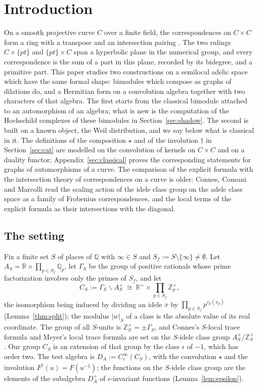 \documentclass[11pt]{amsart}
\theoremstyle{definition}
\theoremstyle{remark}
\newcommand{\R}{\mathbb R}
\newcommand{\Z}{\mathbb Z}
\newcommand{\Q}{\mathbb Q}
\begin{document}
\setcounter{tocdepth}{1}
\tableofcontents

\section{Introduction}\label{sec:intro}

On a smooth projective curve $C$ over a finite field, the correspondences on
$C\times C$ form a ring with a transpose and an intersection pairing
\cite{Weil1948}.  The two rulings $C\times\{pt\}$ and $\{pt\}\times C$ span a
hyperbolic plane in the numerical group, and every correspondence is the sum
of a part in this plane, recorded by its bidegree, and a primitive part.
This paper studies two constructions on a semilocal adelic space which have
the same formal shape: bimodules which compose as graphs of dilations do, and
a Hermitian form on a convolution algebra together with two characters of
that algebra.  The first starts from the classical bimodule attached to an
automorphism of an algebra; what is new is the computation of the Hochschild
complexes of these bimodules in Section~\ref{sec:shadow}.  The second is built on a known object, the
Weil distribution, and we say below what is classical in it.  The definitions
of the composition $\star$ and of the involution $\dagger$ in
Section~\ref{sec:cat} are modelled on the convolution of kernels on
$C\times C$ and on a duality functor; Appendix~\ref{sec:classical} proves the
corresponding statements for graphs of automorphisms of a curve.  The
comparison of the explicit formula with the intersection theory of
correspondences on a curve is older: Connes, Consani and Marcolli
\cite[Section~7.1]{CCM} read the scaling action of the idele class group on
the adele class space as a family of Frobenius correspondences, and the
local terms of the explicit formula as their intersections with the
diagonal.

\subsection*{The setting}

Fix a finite set $S$ of places of $\Q$ with $\infty\in S$ and
$S_f:=S\setminus\{\infty\}\ne\emptyset$.  Let
$A_S=\R\times\prod_{p\in S_f}\Q_p$, let $\Gamma_S$ be the group of positive
rationals whose prime factorization involves only the primes of $S_f$, and
let
\[
C_S:=\Gamma_S\backslash A_S^{\times}\ \cong\
\R^{\times}\times\prod_{p\in S_f}\Z_p^{\times},
\]
the isomorphism being induced by dividing an idele $x$ by
$\prod_{p\in S_f}p^{v_p(x_p)}$ (Lemma~\ref{thm:split}); the modulus
$|w|_S$ of a class is the absolute value of its real coordinate.  The group of
all $S$-units is $\Z_S^{\times}=\pm\Gamma_S$, and Connes's $S$-local trace
formula \cite[Section~VII]{Connes99} and Meyer's local trace formula
\cite[Section~3]{MeyerIdele} are set on the $S$-idele class group
$A_S^{\times}/\Z_S^{\times}$.  Our group $C_S$ is an extension of that group
by the class $\epsilon$ of $-1$, which has order two.  The test algebra is
$D_A:=C_c^{\infty}(C_S)$, with the convolution $\star$ and the involution
$F^{\dagger}(u)=\overline{F(u^{-1})}$; the functions on the $S$-idele class
group are the elements of the subalgebra $D_A^{+}$ of $\epsilon$-invariant
functions (Lemma~\ref{lem:epsilon}).
\end{document}
